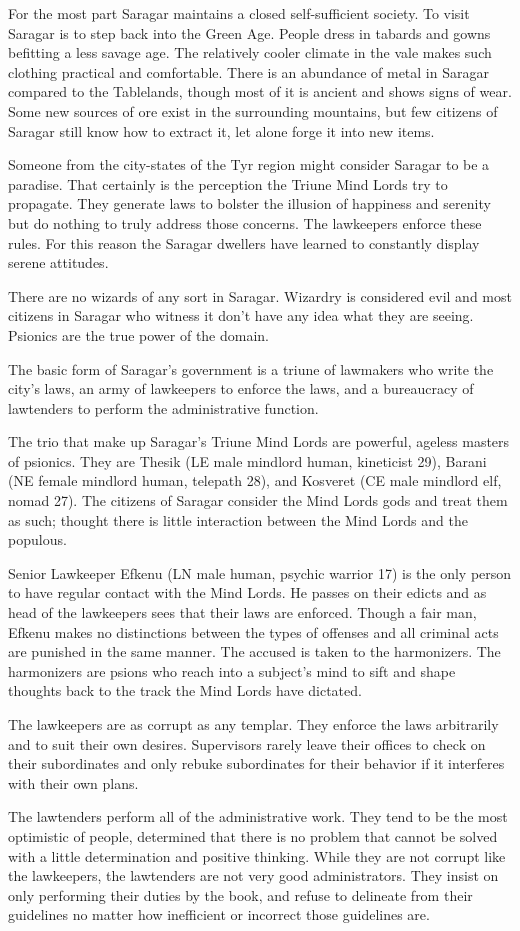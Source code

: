 {
	For the most part Saragar maintains a closed self-sufficient society. To visit Saragar is to step back into the Green Age. People dress in tabards and gowns befitting a less savage age. The relatively cooler climate in the vale makes such clothing practical and comfortable. There is an abundance of metal in Saragar compared to the Tablelands, though most of it is ancient and shows signs of wear. Some new sources of ore exist in the surrounding mountains, but few citizens of Saragar still know how to extract it, let alone forge it into new items.

	Someone from the city-states of the Tyr region might consider Saragar to be a paradise. That certainly is the perception the Triune Mind Lords try to propagate. They generate laws to bolster the illusion of happiness and serenity but do nothing to truly address those concerns. The lawkeepers enforce these rules. For this reason the Saragar dwellers have learned to constantly display serene attitudes.

	There are no wizards of any sort in Saragar. Wizardry is considered evil and most citizens in Saragar who witness it don't have any idea what they are seeing. Psionics are the true power of the domain.
}
{
	The basic form of Saragar's government is a triune of 	lawmakers who write the city's laws, an army of lawkeepers to enforce the laws, and a bureaucracy of lawtenders to perform the administrative function.

	The trio that make up Saragar's Triune Mind Lords are powerful, ageless masters of psionics. They are Thesik (LE male mindlord human, kineticist 29), Barani (NE female mindlord human, telepath 28), and Kosveret (CE male mindlord elf, nomad 27). The citizens of Saragar consider the Mind Lords gods and treat them as such; thought there is little interaction between the Mind Lords and the populous.

	Senior Lawkeeper Efkenu (LN male human, psychic warrior 17) is the only person to have regular contact with the Mind Lords. He passes on their edicts and as head of the lawkeepers sees that their laws are enforced. Though a fair man, Efkenu makes no distinctions between the types of offenses and all criminal acts are punished in the same manner. The accused is taken to the harmonizers. The harmonizers are psions who reach into a subject's mind to sift and shape thoughts back to the track the Mind Lords have dictated.

	The lawkeepers are as corrupt as any templar. They enforce the laws arbitrarily and to suit their own desires. Supervisors rarely leave their offices to check on their subordinates and only rebuke subordinates for their behavior if it interferes with their own plans.

	The lawtenders perform all of the administrative work. They tend to be the most optimistic of people, determined that there is no problem that cannot be solved with a little determination and positive thinking. While they are not corrupt like the lawkeepers, the lawtenders are not very good administrators. They insist on only performing their duties by the book, and refuse to delineate from their guidelines no matter how inefficient or incorrect those guidelines are.
}
